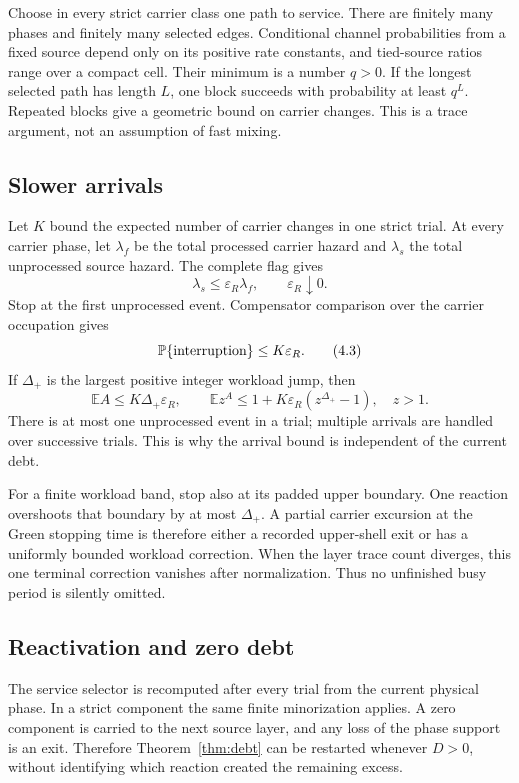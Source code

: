 \documentclass[11pt]{article}
\newcommand{\E}{\mathbb E}
\newcommand{\Pp}{\mathbb P}
\begin{document}
Choose in every strict carrier class one path to service.  There are finitely
many phases and finitely many selected edges.  Conditional channel
probabilities from a fixed source depend only on its positive rate constants,
and tied-source ratios range over a compact cell.  Their minimum is a number
\(q>0\).  If the longest selected path has length \(L\), one block succeeds
with probability at least \(q^L\).  Repeated blocks give a geometric bound
on carrier changes.  This is a trace argument, not an assumption of fast
mixing.

\subsection{Slower arrivals}

Let \(K\) bound the expected number of carrier changes in one strict trial.
At every carrier phase, let \(\lambda_f\) be the total processed carrier
hazard and \(\lambda_s\) the total unprocessed source hazard.  The complete
flag gives
\[
 \lambda_s\le\varepsilon_R\lambda_f,\qquad \varepsilon_R\downarrow0.
\]
Stop at the first unprocessed event.  Compensator comparison over the
carrier occupation gives
\[
 \Pp\{\hbox{interruption}\}\le K\varepsilon_R.   \tag{4.3}
\]
If \(\Delta_+\) is the largest positive integer workload jump, then
\[
 \E A\le K\Delta_+\varepsilon_R,\qquad
 \E z^A\le1+K\varepsilon_R(z^{\Delta_+}-1),\quad z>1. \tag{4.4}
\]
There is at most one unprocessed event in a trial; multiple arrivals are
handled over successive trials.  This is why the arrival bound is independent
of the current debt.

For a finite workload band, stop also at its padded upper boundary.  One
reaction overshoots that boundary by at most \(\Delta_+\).  A partial
carrier excursion at the Green stopping time is therefore either a recorded
upper-shell exit or has a uniformly bounded workload correction.  When the
layer trace count diverges, this one terminal correction vanishes after
normalization.  Thus no unfinished busy period is silently omitted.

\subsection{Reactivation and zero debt}

The service selector is recomputed after every trial from the current
physical phase.  In a strict component the same finite minorization applies.
A zero component is carried to the next source layer, and any loss of the
phase support is an exit.  Therefore Theorem~\ref{thm:debt} can be restarted
whenever \(D>0\), without identifying which reaction created the remaining
excess.
\end{document}
